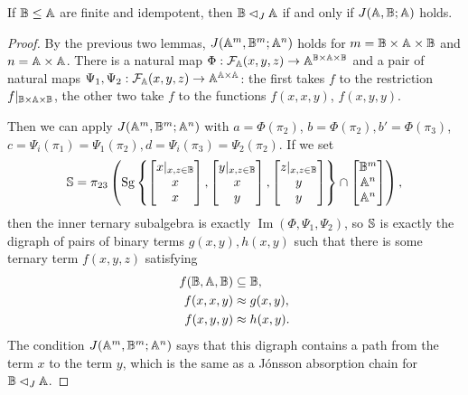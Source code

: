 \documentclass[letterpaper,11pt]{article}
\DeclareMathOperator{\Sg}{Sg}
\begin{document}
\begin{thm}\label{local-jonsson} If $\mathbb{B} \le \mathbb{A}$ are finite and idempotent, then $\mathbb{B} \lhd_J \mathbb{A}$ if and only if $J(\mathbb{A},\mathbb{B};\mathbb{A})$ holds.
\end{thm}
\begin{proof} By the previous two lemmas, $J(\mathbb{A}^m,\mathbb{B}^m;\mathbb{A}^n)$ holds for $m = \mathbb{B}\times\mathbb{A}\times\mathbb{B}$ and $n = \mathbb{A}\times\mathbb{A}$. There is a natural map $\Phi: \mathcal{F}_{\mathbb{A}}(x,y,z) \rightarrow \mathbb{A}^{\mathbb{B}\times\mathbb{A}\times\mathbb{B}}$ and a pair of natural maps $\Psi_1, \Psi_2: \mathcal{F}_{\mathbb{A}}(x,y,z) \rightarrow \mathbb{A}^{\mathbb{A}\times\mathbb{A}}$: the first takes $f$ to the restriction $f|_{\mathbb{B}\times\mathbb{A}\times\mathbb{B}}$, the other two take $f$ to the functions $f(x,x,y)$, $f(x,y,y)$.

Then we can apply $J(\mathbb{A}^m,\mathbb{B}^m;\mathbb{A}^n)$ with $a = \Phi(\pi_2)$, $b = \Phi(\pi_2), b' = \Phi(\pi_3)$, $c = \Psi_i(\pi_1) = \Psi_1(\pi_2), d = \Psi_i(\pi_3) = \Psi_2(\pi_2)$. If we set
\[
\bS = \pi_{23}\left(\Sg\left\{\begin{bmatrix}x|_{x,z\in\bB}\\ x\\ x\end{bmatrix}, \begin{bmatrix} y|_{x,z\in\bB}\\ x\\ y\end{bmatrix}, \begin{bmatrix}z|_{x,z\in\bB}\\ y\\ y\end{bmatrix}\right\}\cap \begin{bmatrix}\bB^m\\ \bA^n\\ \bA^n\end{bmatrix}\right),
\]
then the inner ternary subalgebra is exactly $\operatorname{Im}(\Phi,\Psi_1,\Psi_2)$, so $\mathbb{S}$ is exactly the digraph of pairs of binary terms $g(x,y),h(x,y)$ such that there is some ternary term $f(x,y,z)$ satisfying
\begin{align*}
f(\mathbb{B},\mathbb{A},\mathbb{B}) &\subseteq \mathbb{B},\\
f(x,x,y) &\approx g(x,y),\\
f(x,y,y) &\approx h(x,y).
\end{align*}
The condition $J(\mathbb{A}^m,\mathbb{B}^m;\mathbb{A}^n)$ says that this digraph contains a path from the term $x$ to the term $y$, which is the same as a J\'onsson absorption chain for $\mathbb{B} \lhd_J \mathbb{A}$.
\end{proof}
\end{document}
